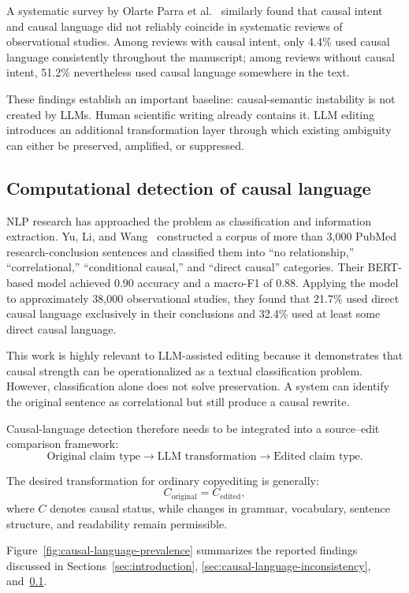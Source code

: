 \documentclass[11pt]{article}
\begin{document}
A systematic survey by Olarte Parra et al.~\cite{olarteparra2022} similarly found that causal intent and causal language did not reliably coincide in systematic reviews of observational studies. Among reviews with causal intent, only 4.4\% used causal language consistently throughout the manuscript; among reviews without causal intent, 51.2\% nevertheless used causal language somewhere in the text.

These findings establish an important baseline: causal-semantic instability is not created by LLMs. Human scientific writing already contains it. LLM editing introduces an additional transformation layer through which existing ambiguity can either be preserved, amplified, or suppressed.

\subsection{Computational detection of causal language}
\label{sec:causal-language-detection}

NLP research has approached the problem as classification and information extraction. Yu, Li, and Wang~\cite{yu2019} constructed a corpus of more than 3,000 PubMed research-conclusion sentences and classified them into ``no relationship,'' ``correlational,'' ``conditional causal,'' and ``direct causal'' categories. Their BERT-based model achieved 0.90 accuracy and a macro-F1 of 0.88. Applying the model to approximately 38,000 observational studies, they found that 21.7\% used direct causal language exclusively in their conclusions and 32.4\% used at least some direct causal language.

This work is highly relevant to LLM-assisted editing because it demonstrates that causal strength can be operationalized as a textual classification problem. However, classification alone does not solve preservation. A system can identify the original sentence as correlational but still produce a causal rewrite.

Causal-language detection therefore needs to be integrated into a source--edit comparison framework:
\[
  \text{Original claim type}
  \rightarrow \text{LLM transformation}
  \rightarrow \text{Edited claim type}.
\]

The desired transformation for ordinary copyediting is generally:
\[
  C_{\text{original}} = C_{\text{edited}},
\]
where $C$ denotes causal status, while changes in grammar, vocabulary, sentence structure, and readability remain permissible.

Figure~\ref{fig:causal-language-prevalence} summarizes the reported findings discussed in Sections~\ref{sec:introduction}, \ref{sec:causal-language-inconsistency}, and~\ref{sec:causal-language-detection}.
\end{document}
